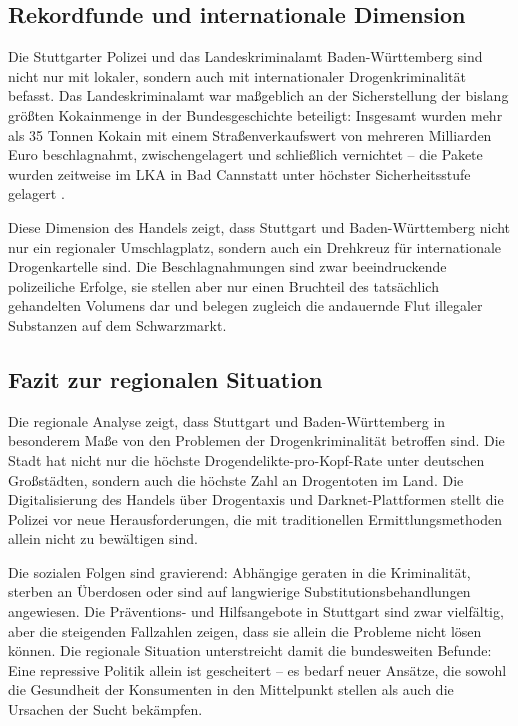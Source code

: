 \documentclass[11pt,a4paper]{article}
\begin{document}
	\subsection{Rekordfunde und internationale Dimension}
	
	Die Stuttgarter Polizei und das Landeskriminalamt Baden-Württemberg sind nicht nur mit lokaler, sondern auch mit internationaler Drogenkriminalität befasst. Das Landeskriminalamt war maßgeblich an der Sicherstellung der bislang größten Kokainmenge in der Bundesgeschichte beteiligt: Insgesamt wurden mehr als 35 Tonnen Kokain mit einem Straßenverkaufswert von mehreren Milliarden Euro beschlagnahmt, zwischengelagert und schließlich vernichtet – die Pakete wurden zeitweise im LKA in Bad Cannstatt unter höchster Sicherheitsstufe gelagert \cite{kokainfund-lka}.
	
	Diese Dimension des Handels zeigt, dass Stuttgart und Baden-Württemberg nicht nur ein regionaler Umschlagplatz, sondern auch ein Drehkreuz für internationale Drogenkartelle sind. Die Beschlagnahmungen sind zwar beeindruckende polizeiliche Erfolge, sie stellen aber nur einen Bruchteil des tatsächlich gehandelten Volumens dar und belegen zugleich die andauernde Flut illegaler Substanzen auf dem Schwarzmarkt.
	
	\subsection{Fazit zur regionalen Situation}
	
	Die regionale Analyse zeigt, dass Stuttgart und Baden-Württemberg in besonderem Maße von den Problemen der Drogenkriminalität betroffen sind. Die Stadt hat nicht nur die höchste Drogendelikte-pro-Kopf-Rate unter deutschen Großstädten, sondern auch die höchste Zahl an Drogentoten im Land. Die Digitalisierung des Handels über Drogentaxis und Darknet-Plattformen stellt die Polizei vor neue Herausforderungen, die mit traditionellen Ermittlungsmethoden allein nicht zu bewältigen sind.
	
	Die sozialen Folgen sind gravierend: Abhängige geraten in die Kriminalität, sterben an Überdosen oder sind auf langwierige Substitutionsbehandlungen angewiesen. Die Präventions- und Hilfsangebote in Stuttgart sind zwar vielfältig, aber die steigenden Fallzahlen zeigen, dass sie allein die Probleme nicht lösen können. Die regionale Situation unterstreicht damit die bundesweiten Befunde: Eine repressive Politik allein ist gescheitert – es bedarf neuer Ansätze, die sowohl die Gesundheit der Konsumenten in den Mittelpunkt stellen als auch die Ursachen der Sucht bekämpfen.
	
\end{document}
